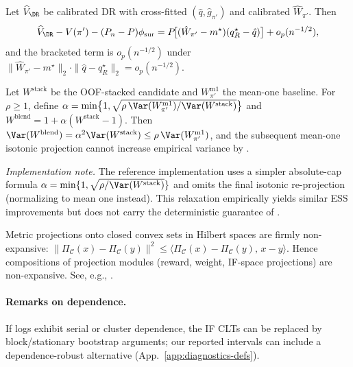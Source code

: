 \begin{lemma}
\label{lem:remainder}
Let $\widehat V_{\DR}$ be calibrated DR with cross-fitted $(\hat q,\hat g_{\pi'})$ and calibrated $\hat W_{\pi'}$. Then
\[
\widehat V_{\DR}-V(\pi')-(P_n-P)\phi_{\mathrm{sur}}
= P\!\big[(\hat W_{\pi'}-m^\star)(q^\star_R-\hat q)\big]+o_p(n^{-1/2}),
\]
and the bracketed term is $o_p(n^{-1/2})$ under $\|\hat W_{\pi'}-m^\star\|_2\cdot \|\hat q-q^\star_R\|_2=o_p(n^{-1/2})$.
\end{lemma}

\begin{lemma}
\label{lem:guard}
Let $W^{\mathrm{stack}}$ be the OOF-stacked candidate and $W^{\mathrm{m1}}_{\pi'}$ the mean-one baseline. For $\rho\ge1$, define $\alpha=\min\!\big\{1,\sqrt{\rho\,\Var(W^{\mathrm{m1}}_{\pi'})/\Var(W^{\mathrm{stack}})}\big\}$ and $W^{\mathrm{blend}}=1+\alpha(W^{\mathrm{stack}}-1)$. Then $\Var(W^{\mathrm{blend}})=\alpha^2\Var(W^{\mathrm{stack}})\le \rho\,\Var(W^{\mathrm{m1}}_{\pi'})$, and the subsequent mean-one isotonic projection cannot increase empirical variance by .
\end{lemma}

\emph{Implementation note.} The reference implementation uses a simpler absolute-cap formula $\alpha=\min\{1,\sqrt{\rho/\Var(W^{\mathrm{stack}})}\}$ and omits the final isotonic re-projection (normalizing to mean one instead). This relaxation empirically yields similar ESS improvements but does not carry the deterministic guarantee of .

\begin{lemma}
\label{lem:firm}
Metric projections onto closed convex sets in Hilbert spaces are firmly non-expansive:
$\|\Pi_{\mathcal{C}}(x)-\Pi_{\mathcal{C}}(y)\|^2 \le \langle \Pi_{\mathcal{C}}(x)-\Pi_{\mathcal{C}}(y),\, x-y\rangle$.
Hence compositions of projection modules (reward, weight, IF-space projections) are non-expansive. See, e.g., \citet[Prop.~4.16]{BauschkeCombettes2017}.
\end{lemma}

\paragraph{Remarks on dependence.}
If logs exhibit serial or cluster dependence, the IF CLTs can be replaced by block/stationary bootstrap arguments; our reported intervals can include a dependence-robust alternative (App.~\ref{app:diagnostics-defs}).

